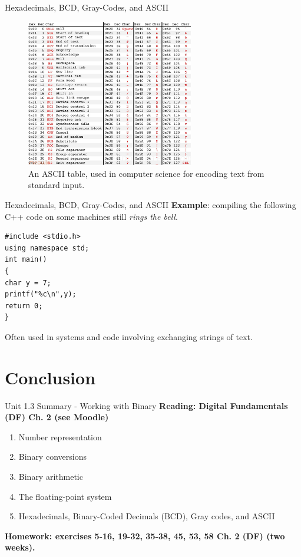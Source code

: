 \documentclass{beamer}
\begin{document}
\begin{frame}{Hexadecimals, BCD, Gray-Codes, and ASCII}
\begin{figure}
\centering
\includegraphics[width=0.65\textwidth]{figures/ascii.jpg}
\caption{\label{fig:ascii} \small An ASCII table, used in computer science for encoding text from standard input.}
\end{figure}
\end{frame}

\begin{frame}[fragile]{Hexadecimals, BCD, Gray-Codes, and ASCII}
\textbf{Example}: compiling the following C++ code on some machines still \textit{rings the bell}.
\begin{verbatim}
#include <stdio.h>
using namespace std;
int main()
{
char y = 7;
printf("%c\n",y);
return 0;
}
\end{verbatim}
\small
Often used in systems and code involving exchanging strings of text.
\end{frame}

\section{Conclusion}

\begin{frame}{Unit 1.3 Summary - Working with Binary}
\textbf{Reading: Digital Fundamentals (DF) Ch. 2 (see Moodle)}
\begin{enumerate}
\item Number representation
\item Binary conversions
\item Binary arithmetic
\item The floating-point system
\item Hexadecimals, Binary-Coded Decimals (BCD), Gray codes, and ASCII
\end{enumerate}
\textbf{Homework: exercises 5-16, 19-32, 35-38, 45, 53, 58 Ch. 2 (DF) (two weeks).}
\end{frame}
\end{document}
